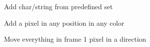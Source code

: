 \documentclass[12pt]{article} %
\begin{document}
\begin{figure}[H]
	\centering
	\caption{Add char/string from predefined set}
	\label{fig:UC4}
\end{figure}

\begin{figure}[H]
	\centering
	\caption{Add a pixel in any position in any color}
	\label{fig:UC5}
\end{figure}

\begin{figure}[H]
	\centering
	\caption{Move everything in frame 1 pixel in a direction}
	\label{fig:UC6}
\end{figure}
\end{document}
